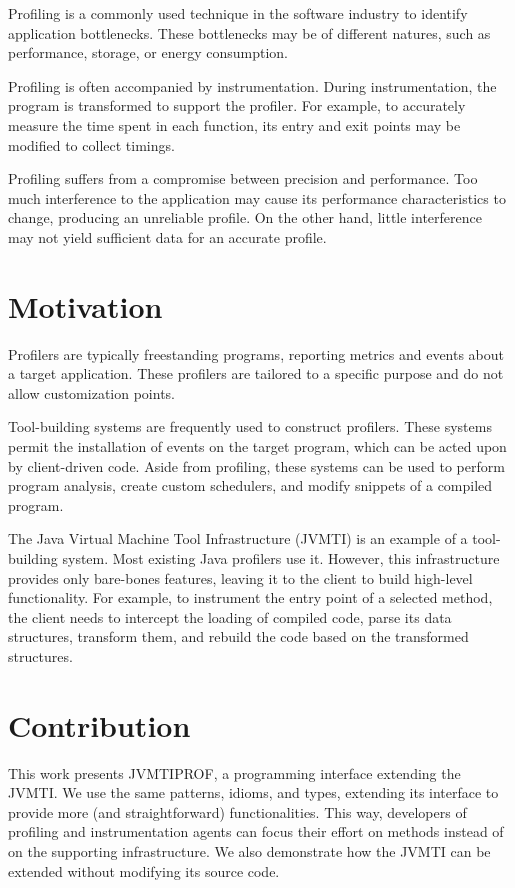 \label{cap:introduction}

Profiling is a commonly used technique in the software industry to identify application bottlenecks. These bottlenecks may be of different natures, such as performance, storage, or energy consumption.

Profiling is often accompanied by instrumentation. During instrumentation, the program is transformed to support the profiler. For example, to accurately measure the time spent in each function, its entry and exit points may be modified to collect timings.

Profiling suffers from a compromise between precision and performance. Too much interference to the application may cause its performance characteristics to change, producing an unreliable profile. On the other hand, little interference may not yield sufficient data for an accurate profile.

\section{Motivation}

Profilers are typically freestanding programs, reporting metrics and events about a target application. These profilers are tailored to a specific purpose and do not allow customization points.

Tool-building systems are frequently used to construct profilers. These systems permit the installation of events on the target program, which can be acted upon by client-driven code. Aside from profiling, these systems can be used to perform program analysis, create custom schedulers, and modify snippets of a compiled program.

The Java Virtual Machine Tool Infrastructure (JVMTI) is an example of a tool-building system. Most existing Java profilers use it. However, this infrastructure provides only bare-bones features, leaving it to the client to build high-level functionality. For example, to instrument the entry point of a selected method, the client needs to intercept the loading of compiled code, parse its data structures, transform them, and rebuild the code based on the transformed structures.

\section{Contribution}

This work presents JVMTIPROF, a programming interface extending the JVMTI. We use the same patterns, idioms, and types, extending its interface to provide more (and straightforward) functionalities. This way, developers of profiling and instrumentation agents can focus their effort on methods instead of on the supporting infrastructure. We also demonstrate how the JVMTI can be extended without modifying its source code.

